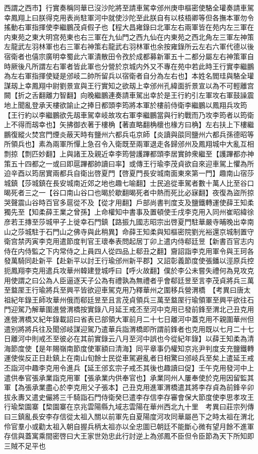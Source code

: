 西謂之西市】行實奏稱同華已沒沙陀將至請車駕幸邠州庚申樞密使駱全瓘奏請車駕幸鳳翔上曰朕得克用表尚駐軍河中就使沙陀至此朕自有以枝梧卿等但各撫本軍勿令搖動右軍指揮使李繼鵬茂貞假子也【程大昌雍錄曰北軍左右兩軍皆在苑内左三軍在内東苑之東大明宫苑東也右三軍在九仙門之西九仙在内東苑之西北角左三軍左神策左龍武左羽林軍也右三軍右神策右龍武右羽林軍也余按雍錄所云左右六軍代德以後宿衛者也僖宗廣明幸蜀此六軍潰散田令孜於成都募新軍五十二都分屬左右神策軍自時厥後凡所謂左右軍者皆此軍也分營於京城内外又不專在苑中若此時王行實李繼鵬為左右軍指揮使疑是邠岐二帥所留兵以宿衛者自分為左右也】本姓名閻珪與駱全瓘謀刼上幸鳳翔中尉劉景宣與王行實知之欲刼上幸邠州孔緯面折景宣以為不可輕離宫闕【折之舌翻離力智翻】向晚繼鵬連奏請車駕出幸於是王行約引左軍攻右軍鼓譟震地上聞亂登承天樓欲諭止之捧日都頭李筠將本軍於樓前侍衛李繼鵬以鳳翔兵攻筠【王行約以李繼鵬欲先刼車駕幸岐故攻右軍李繼鵬當與行約戰而乃攻李筠者以筠衛上不得而刼幸也】矢拂御衣著于樓桷【著直略翻桷櫰也椽方曰桷】左右扶上下樓繼鵬復縱火焚宫門煙炎蔽天時有鹽州六都兵屯京師【炎讀與燄同鹽州六都兵孫德昭等所領兵也】素為兩軍所憚上急召令入衛既至兩軍退走各歸邠州及鳳翔城中大亂互相剽掠【剽匹妙翻】上與諸王及親近幸李筠營護蹕都頭李居實帥衆繼至【護蹕都亦神策五十四都之一或曰即扈蹕都帥讀曰率】或傳王行瑜李茂貞欲自來迎車駕上懼為所迫辛酉以筠居實兩都兵自衛出啓夏門【啓夏門長安城南面東來第一門】趣南山宿莎城鎮【莎城鎮在長安城南近郊之地也趣七喻翻】士民追從車駕者數十萬人比至谷口暍死者三之一【谷口南山谷口也暍於歇翻暍死者中熱而死比必寐翻】夜復為盜所掠哭聲震山谷時百官多扈從不及【從才用翻】戶部尚書判度支及鹽鐵轉運使薛王知柔獨先至【知柔薛王業之曾孫】上命權知中書事及置頓使壬戌李克用入同州崔昭緯徐彦若王摶至莎城甲子上徙幸石門鎮【路振九國志昭宗出啓夏門駐華嚴寺晡晚出幸南山之莎城駐于石門山之佛寺與此稍異】命薛王知柔與知樞密院劉光裕還京城制置守衛宫禁丙寅李克用遣節度判官王瓌奉表問起居丁卯上遣内侍郗廷昱【新書百官志内侍在内侍監之下内常侍之上員四人從四品上郗丑之翻】齎詔詣李克用軍令與王珂各發萬騎同赴新平【赴新平以討王行瑜邠州新平郡】又詔彰義節度使張鐇以涇原兵控扼鳳翔李克用遣兵攻華州韓建登城呼曰【呼火故翻】僕於李公未嘗失禮何為見攻克用使謂之曰公為人臣逼逐天子公為有禮孰為無禮者乎會郗廷昱至言李茂貞將兵三萬至盩厔王行瑜將兵至興平皆欲迎車駕克用乃釋華州之圍移兵營渭橋　【考異曰唐太祖紀年錄王師攻華州俄而郗廷昱至且言茂貞領兵三萬至盩厔行瑜領軍至興平欲往石門迎駕乃解華圍進營渭橋按實錄八月延王戒丕至河中克用已發前鋒至渭北己丑克用進營渭橋又紀年錄載詔曰省表已部領大軍前月二十七日離河中蓋克用不親圍華州但遣别將將兵往及聞邠岐謀迎駕乃遣華兵詣渭橋即所謂前鋒者也克用既以七月二十七日離河中則戒丕至彼必在其前實錄云八月至河中誤也今從紀年錄】以薛王知柔為清海節度使【是年賜嶺南節度使軍額曰清海】同平章事仍權知京兆尹判度支充鹽鐵轉運使俟反正日赴鎮上在南山旬餘士民從車駕避亂者日相驚曰邠岐兵至矣上遣延王戒丕詣河中趣李克用令進兵【延王邠玄宗子戒丕其後也趣讀曰促】壬午克用發河中上遣供奉官張承業詣克用軍【張承業内供奉官也】承業同州人屢奉使於克用因留監其軍【為張承業盡心於李克用父子張本】己丑克用進軍渭橋遣其將李存貞為前鋒辛卯拔永夀又遣史儼將三千騎詣石門侍衛癸巳遣李存信李存審會保大節度使李思孝攻王行瑜棃園寨【棃園寨在京兆雲陽縣九域志雲陽在華州西北九十里　考異曰莊宗列傳曰三鎮亂長安李存信從太祖入關以前軍先自夏陽度河攻同華屬邑下之時太祖在渭北伶官羣小或勸太祖入朝自握兵柄太祖亦以全忠圖已朝廷不能斷心微有望月餘不進軍存信與蓋寓乘間密啓曰大王家世効忠此行討逆上為邠鳳不臣但令臣節為天下所知即三賊不足平也